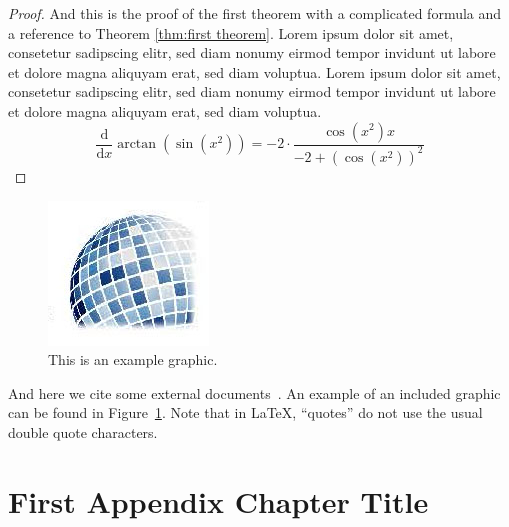 \documentclass[a4paper, oneside]{discothesis}
\begin{document}
\begin{proof}
	And this is the proof of the first theorem with a complicated formula and a reference to Theorem \ref{thm:first theorem}. Lorem ipsum dolor sit amet, consetetur sadipscing elitr, sed diam nonumy eirmod tempor invidunt ut labore et dolore magna aliquyam erat, sed diam voluptua. Lorem ipsum dolor sit amet, consetetur sadipscing elitr, sed diam nonumy eirmod tempor invidunt ut labore et dolore magna aliquyam erat, sed diam voluptua.
	\begin{equation}
		{\frac {\mathrm d}{\mathrm dx}}\arctan(\sin({x}^{2}))=-2 \cdot {\frac {\cos({x}^{2})x}{-2+\left (\cos({x}^{2})\right )^{2}}}
	\end{equation}
\end{proof}

\begin{figure}
    \centering
    \includegraphics[width=0.2\columnwidth]{figures/disco_logo_faded}
    \caption{This is an example graphic.}
    \label{fig:example_figure}
\end{figure}

And here we cite some external documents~\cite{TestReference, TestReference2}.
An example of an included graphic can be found in Figure~\ref{fig:example_figure}.
Note that in \LaTeX, ``quotes'' do not use the usual double quote characters.




\appendix
\chapter{First Appendix Chapter Title}
\end{document}
